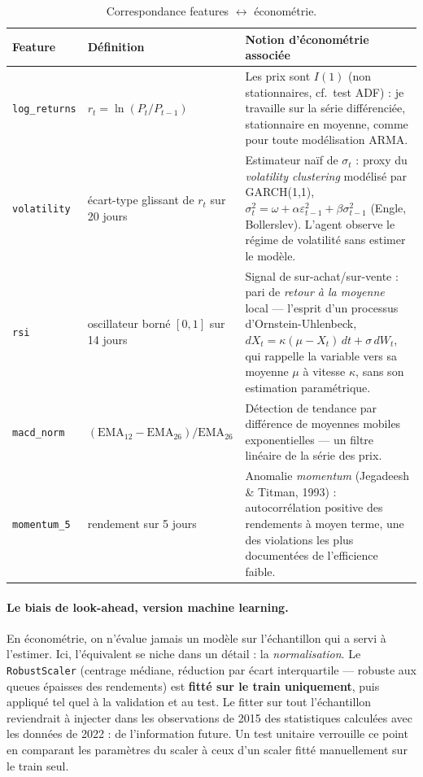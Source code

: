 \documentclass[11pt,a4paper]{article}
\newcommand{\code}[1]{\texttt{#1}}
\begin{document}
\begin{table}[H]
\centering\small
\begin{tabular}{@{}lp{5.6cm}p{6.2cm}@{}}
\toprule
\textbf{Feature} & \textbf{Définition} & \textbf{Notion d'économétrie associée} \\
\midrule
\code{log\_returns} & $r_t = \ln(P_t/P_{t-1})$ &
Les prix sont $I(1)$ (non stationnaires, cf.\ test ADF) : je travaille sur la série
différenciée, stationnaire en moyenne, comme pour toute modélisation ARMA. \\
\addlinespace
\code{volatility} & écart-type glissant de $r_t$ sur 20 jours &
Estimateur naïf de $\sigma_t$ : proxy du \emph{volatility clustering} modélisé par
GARCH(1,1), $\sigma_t^2 = \omega + \alpha \varepsilon_{t-1}^2 + \beta \sigma_{t-1}^2$
(Engle, Bollerslev). L'agent observe le régime de volatilité sans estimer le modèle. \\
\addlinespace
\code{rsi} & oscillateur borné $[0,1]$ sur 14 jours &
Signal de sur-achat/sur-vente : pari de \emph{retour à la moyenne} local --- l'esprit
d'un processus d'Ornstein-Uhlenbeck, $dX_t = \kappa(\mu - X_t)\,dt + \sigma\,dW_t$,
qui rappelle la variable vers sa moyenne $\mu$ à vitesse $\kappa$, sans son estimation
paramétrique. \\
\addlinespace
\code{macd\_norm} & $(\text{EMA}_{12}-\text{EMA}_{26})/\text{EMA}_{26}$ &
Détection de tendance par différence de moyennes mobiles exponentielles ---
un filtre linéaire de la série des prix. \\
\addlinespace
\code{momentum\_5} & rendement sur 5 jours &
Anomalie \emph{momentum} (Jegadeesh \& Titman, 1993) : autocorrélation positive des
rendements à moyen terme, une des violations les plus documentées de l'efficience
faible. \\
\bottomrule
\end{tabular}
\caption{Correspondance features $\leftrightarrow$ économétrie.}
\end{table}

\paragraph{Le biais de look-ahead, version machine learning.}
En économétrie, on n'évalue jamais un modèle sur l'échantillon qui a servi à l'estimer.
Ici, l'équivalent se niche dans un détail : la \emph{normalisation}. Le
\code{RobustScaler} (centrage médiane, réduction par écart interquartile --- robuste aux
queues épaisses des rendements) est \textbf{fitté sur le train uniquement}, puis appliqué
tel quel à la validation et au test. Le fitter sur tout l'échantillon reviendrait à
injecter dans les observations de 2015 des statistiques calculées avec les données de
2022 : de l'information future. Un test unitaire verrouille ce point en comparant les
paramètres du scaler à ceux d'un scaler fitté manuellement sur le train seul.
\end{document}
